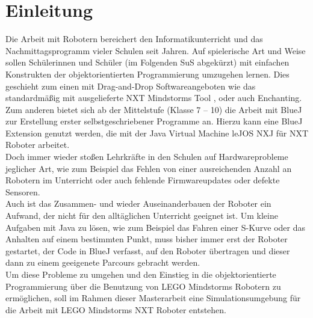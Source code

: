 \documentclass[paper=a4, pagesize, DIV=calc, BCOR=12.5mm, twoside=on, onecolumn=on, open = any, titlepage =on, parskip =half-, headsepline = on, footsepline = on, chapterprefix = on, appendixprefix = off, fontsize = 12pt, numbers = noenddot, abstract = on]{scrbook}
\numberwithin{equation}{chapter}
\theoremstyle{definition}
\theoremstyle{plain}
\theoremstyle{plain}
\theoremstyle{remark}
\theoremstyle{plain}
\theoremstyle{plain}
\begin{document}
\newpage
\thispagestyle{plain}

\newcommand*\diff{\mathop{}\!\mathrm{d}}



\thispagestyle{empty}
\cleardoublepage



\newpage
\listoffigures
\newpage
\tableofcontents
\thispagestyle{empty}
\cleardoublepage
\newpage
{}
\par \singlespacing
\chapter{Einleitung}
\onehalfspacing
Die Arbeit mit Robotern bereichert den Informatikunterricht und das Nachmittagsprogramm vieler Schulen seit Jahren. Auf spielerische Art und Weise sollen Schülerinnen und Schüler (im Folgenden SuS abgekürzt) mit einfachen Konstrukten der objektorientierten Programmierung umzugehen lernen. Dies geschieht zum einen mit Drag-and-Drop Softwareangeboten wie das standardmäßig mit ausgelieferte NXT Mindstorms Tool , oder auch Enchanting.  Zum anderen bietet sich ab der Mittelstufe (Klasse 7 -- 10) die Arbeit mit BlueJ zur Erstellung erster selbstgeschriebener Programme an. Hierzu kann eine BlueJ Extension genutzt werden, die mit der Java Virtual Machine leJOS NXJ für NXT Roboter arbeitet.\\

Doch immer wieder stoßen Lehrkräfte in den Schulen auf Hardwareprobleme jeglicher Art, wie zum Beispiel das Fehlen von einer ausreichenden Anzahl an Robotern im Unterricht oder auch fehlende Firmwareupdates oder defekte Sensoren.\\
Auch ist das Zusammen- und wieder Auseinanderbauen der Roboter ein Aufwand, der nicht für den alltäglichen Unterricht geeignet ist. Um kleine Aufgaben mit Java zu lösen, wie zum Beispiel das Fahren einer S-Kurve oder das Anhalten auf einem bestimmten Punkt, muss bisher immer erst der Roboter gestartet, der Code in BlueJ verfasst, auf den Roboter übertragen und dieser dann zu einem geeigenete Parcours gebracht werden.\\

Um diese Probleme zu umgehen und den Einstieg in die objektorientierte Programmierung über die Benutzung von LEGO Mindstorms Robotern zu ermöglichen, soll im Rahmen dieser Masterarbeit eine Simulationsumgebung für die Arbeit mit LEGO Mindstorms NXT Roboter entstehen.
\newpage
\par\singlespacing
\end{document}
